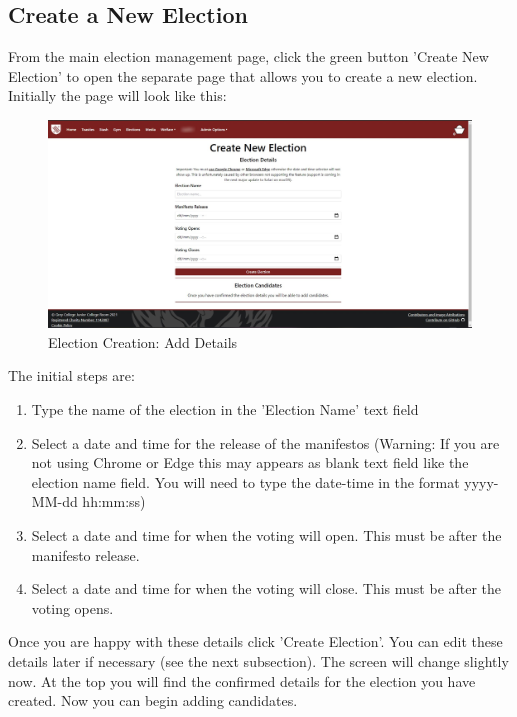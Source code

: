 \documentclass{article}
\begin{document}
\subsection{Create a New Election}
From the main election management page, click the green button 'Create New Election' to open the separate page that allows you to create a new election. Initially the page will look like this:
\begin{figure}[H]
    \centering
    \includegraphics[width=\textwidth,height=\textheight,keepaspectratio]{elections/initial_create_screen.png}
    \caption{Election Creation: Add Details}
    \label{fig:election_creation_start}
\end{figure}
The initial steps are:
\begin{enumerate}
    \item Type the name of the election in the 'Election Name' text field
    \item Select a date and time for the release of the manifestos (Warning: If you are not using Chrome or Edge this may appears as blank text field like the election name field. You will need to type the date-time in the format yyyy-MM-dd hh:mm:ss)
    \item Select a date and time for when the voting will open. This must be after the manifesto release.
    \item Select a date and time for when the voting will close. This must be after the voting opens.
\end{enumerate}
Once you are happy with these details click 'Create Election'. You can edit these details later if necessary (see the next subsection). The screen will change slightly now. At the top you will find the confirmed details for the election you have created. Now you can begin adding candidates.
\end{document}
